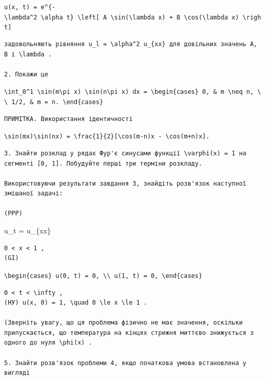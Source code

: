 \documentclass[
  ukrainian,
]{article}
\begin{document}
\texttt{u(x,\ t)\ =\ e\^{}\{-\textbackslash{}lambda\^{}2\ \textbackslash{}alpha\textquotesingle{}\ t\}\ \textbackslash{}left{[}\ A\ \textbackslash{}sin(\textbackslash{}lambda\ x)\ +\ B\ \textbackslash{}cos(\textbackslash{}lambda\ x)\ \textbackslash{}right{]}}

\begin{verbatim}
задовольняють рівняння u_l = \alpha^2 u_{xx} для довільних значень A, B і \lambda .

2. Покажи це
\end{verbatim}

\texttt{\textbackslash{}int\_0\^{}1\ \textbackslash{}sin(m\textbackslash{}pi\ x)\ \textbackslash{}sin(n\textbackslash{}pi\ x)\ dx\ =\ \textbackslash{}begin\{cases\}\ 0,\ \&\ m\ \textbackslash{}neq\ n,\ \textbackslash{}\textbackslash{}\ 1/2,\ \&\ m\ =\ n.\ \textbackslash{}end\{cases\}}

\begin{verbatim}
ПРИМІТКА. Використання ідентичності
\end{verbatim}

\texttt{\textbackslash{}sin(mx)\textbackslash{}sin(nx)\ =\ \textbackslash{}frac\{1\}\{2\}{[}\textbackslash{}cos(m-n)x\ -\ \textbackslash{}cos(m+n)x{]}.}

\begin{verbatim}
3. Знайти розклад у рядах Фур'є синусами функції \varphi(x) = 1 на сегменті [0, 1]. Побудуйте перші три терміни розкладу.

Використовуючи результати завдання 3, знайдіть розв'язок наступної змішаної задачі:

(PPP)
\end{verbatim}

u\_t = u\_\{xx\}

\begin{verbatim}
0 < x < 1 , 
(GI)
\end{verbatim}

\texttt{\textbackslash{}begin\{cases\}\ u(0,\ t)\ =\ 0,\ \textbackslash{}\textbackslash{}\ u(1,\ t)\ =\ 0,\ \textbackslash{}end\{cases\}}

\begin{verbatim}
0 < t < \infty , 
(НУ) u(x, 0) = 1, \quad 0 \le x \le 1 .

(Зверніть увагу, що ця проблема фізично не має значення, оскільки припускається, що температура на кінцях стрижня миттєво знижується з одного до нуля \phi(x) .

5. Знайти розв'язок проблеми 4, якщо початкова умова встановлена у вигляді
\end{verbatim}
\end{document}
